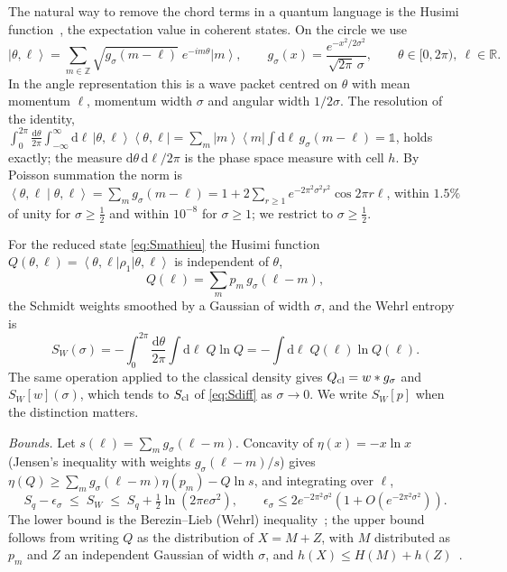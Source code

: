 \documentclass[preprint,12pt]{elsarticle}
\newcommand{\ket}[1]{\left|#1\right\rangle}
\newcommand{\bra}[1]{\left\langle#1\right|}
\newcommand{\braket}[2]{\left\langle#1\middle|#2\right\rangle}
\newcommand{\ketbra}[2]{\left|#1\right\rangle\!\left\langle#2\right|}
\newcommand{\dd}{\mathrm{d}}
\newcommand{\Scl}{S_{\rm cl}}
\newcommand{\SW}{S_{W}}
\begin{document}
The natural way to remove the chord terms in a quantum language is the Husimi
function~\cite{Husimi}, the expectation value in coherent states. On the circle
we use~\cite{KRP,GonzalezOlmo}
\begin{equation}
\ket{\theta,\ell}=\sum_{m\in\mathbb{Z}}\sqrt{g_{\sigma}(m-\ell)}\;e^{-im\theta}
\ket m,\qquad g_{\sigma}(x)=\frac{e^{-x^{2}/2\sigma^{2}}}{\sqrt{2\pi}\,\sigma},
\qquad\theta\in[0,2\pi),\ \ell\in\mathbb{R}.
\label{eq:cs}
\end{equation}
In the angle representation this is a wave packet centred on $\theta$ with
mean momentum $\ell$, momentum width $\sigma$ and angular width $1/2\sigma$. The
resolution of the identity,
$\int_{0}^{2\pi}\frac{\dd\theta}{2\pi}\int_{-\infty}^{\infty}\dd\ell\,
\ketbra{\theta,\ell}{\theta,\ell}=\sum_{m}\ketbra mm\int\dd\ell\,g_{\sigma}(m-\ell)
=\mathbb{1}$, holds exactly; the measure $\dd\theta\,\dd\ell/2\pi$ is the phase
space measure with cell $h$. By Poisson summation the norm is
$\braket{\theta,\ell}{\theta,\ell}=\sum_{m}g_{\sigma}(m-\ell)=1+2\sum_{r\ge1}
e^{-2\pi^{2}\sigma^{2}r^{2}}\cos2\pi r\ell$, within $1.5\%$ of unity for
$\sigma\ge\tfrac12$ and within $10^{-8}$ for $\sigma\ge1$; we restrict to
$\sigma\ge\tfrac12$.

For the reduced state \eqref{eq:Smathieu} the Husimi function
$Q(\theta,\ell)=\bra{\theta,\ell}\rho_{1}\ket{\theta,\ell}$ is independent of
$\theta$,
\begin{equation}
Q(\ell)=\sum_{m}p_{m}\,g_{\sigma}(\ell-m),
\label{eq:Q}
\end{equation}
the Schmidt weights smoothed by a Gaussian of width $\sigma$, and the Wehrl
entropy~\cite{Wehrl,Wehrl79} is
\begin{equation}
\SW(\sigma)=-\int_{0}^{2\pi}\frac{\dd\theta}{2\pi}\int\dd\ell\;Q\ln Q
=-\int\dd\ell\;Q(\ell)\ln Q(\ell).
\label{eq:SW}
\end{equation}
The same operation applied to the classical density gives
$Q_{\rm cl}=w*g_{\sigma}$ and $\SW[w](\sigma)$, which tends to $\Scl$ of
\eqref{eq:Sdiff} as $\sigma\to0$. We write $\SW[p]$ when the distinction
matters.

\emph{Bounds.} Let $s(\ell)=\sum_{m}g_{\sigma}(\ell-m)$. Concavity of
$\eta(x)=-x\ln x$ (Jensen's inequality with weights $g_{\sigma}(\ell-m)/s$) gives
$\eta(Q)\ge\sum_{m}g_{\sigma}(\ell-m)\eta(p_{m})-Q\ln s$, and integrating over
$\ell$,
\begin{equation}
S_{q}-\epsilon_{\sigma}\;\le\;\SW\;\le\;S_{q}+\tfrac12\ln\left(2\pi e\sigma^{2}\right),
\qquad \epsilon_{\sigma}\le2e^{-2\pi^{2}\sigma^{2}}(1+O(e^{-2\pi^{2}\sigma^{2}})).
\label{eq:bounds}
\end{equation}
The lower bound is the Berezin--Lieb (Wehrl) inequality~\cite{Berezin,Wehrl79,Lieb};
the upper bound follows from writing $Q$ as the distribution of $X=M+Z$, with
$M$ distributed as $p_{m}$ and $Z$ an independent Gaussian of width $\sigma$, and
$h(X)\le H(M)+h(Z)$~\cite{CoverThomas}.
\end{document}
